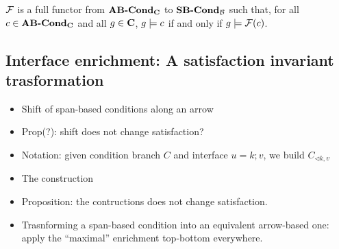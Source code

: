 \begin{theorem}
$\mathcal{F}$ is a full functor from $\textbf{AB-Cond}_{\mathbf{C}}$ to $\textbf{SB-Cond}_{\mathcal{B}}$ such that, for all $c\in \textbf{AB-Cond}_{\mathbf{C}}$ and all $g\in \mathbf{C}$, $g\models c$ if and only if $g\models \mathcal{F}(c)$.
\end{theorem}


\subsection{Interface enrichment: A satisfaction invariant trasformation}

\begin{itemize}
  \item Shift of span-based conditions along an arrow
  \item Prop(?): shift does not change satisfaction?
  \item Notation: given condition branch $C$ and interface $u = k;v$, we build $C_{\triangleleft k, v}$
  \item The construction
  \item Proposition: the contructions does not change satisfaction.
  \item Trasnforming a span-based condition into an equivalent arrow-based one: apply the ``maximal'' enrichment top-bottom everywhere.
\end{itemize}  



